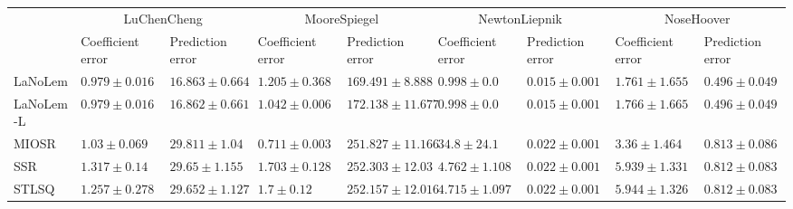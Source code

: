 \begin{table*}
{\begin{tabular}{lllllllll}
\midrule

 & \multicolumn{2}{c}{LuChenCheng} & \multicolumn{2}{c}{MooreSpiegel} & \multicolumn{2}{c}{NewtonLiepnik} & \multicolumn{2}{c}{NoseHoover} \\
 & Coefficient error & Prediction error & Coefficient error & Prediction error & Coefficient error & Prediction error & Coefficient error & Prediction error \\
\midrule
LaNoLem & $0.979\pm 0.016$ & $16.863\pm 0.664$ & $1.205\pm 0.368$ & $\mathbf{169.491}\pm 8.888$ & $0.998\pm 0.0$ & $0.015\pm 0.001$ & $\mathbf{1.761}\pm 1.655$ & $0.496\pm 0.049$ \\
LaNoLem-L & $\mathbf{0.979}\pm 0.016$ & $\mathbf{16.862}\pm 0.661$ & $1.042\pm 0.006$ & $172.138\pm 11.677$ & $\mathbf{0.998}\pm 0.0$ & $\mathbf{0.015}\pm 0.001$ & $1.766\pm 1.665$ & $\mathbf{0.496}\pm 0.049$ \\
MIOSR & $1.03\pm 0.069$ & $29.811\pm 1.04$ & $\mathbf{0.711}\pm 0.003$ & $251.827\pm 11.166$ & $34.8\pm 24.1$ & $0.022\pm 0.001$ & $3.36\pm 1.464$ & $0.813\pm 0.086$ \\
SSR & $1.317\pm 0.14$ & $29.65\pm 1.155$ & $1.703\pm 0.128$ & $252.303\pm 12.03$ & $4.762\pm 1.108$ & $0.022\pm 0.001$ & $5.939\pm 1.331$ & $0.812\pm 0.083$ \\
STLSQ & $1.257\pm 0.278$ & $29.652\pm 1.127$ & $1.7\pm 0.12$ & $252.157\pm 12.016$ & $4.715\pm 1.097$ & $0.022\pm 0.001$ & $5.944\pm 1.326$ & $0.812\pm 0.083$ \\

\bottomrule
\end{tabular}
}
\end{table*}

